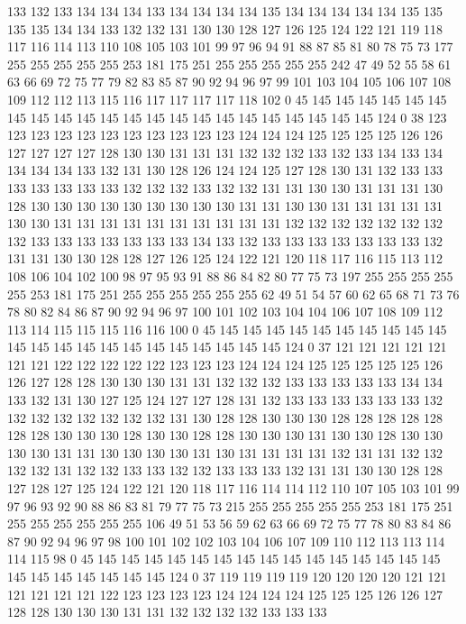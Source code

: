 133 132 133 134 134 134 133 134 134 134 134 135 134 134 134 134 134 135 135 135
135 134 134 133 132 132 131 130 130 128 127 126 125 124 122 121 119 118 117 116
114 113 110 108 105 103 101 99 97 96 94 91 88 87 85 81 80 78 75 73
177 255 255 255 255 255 253 181 175 251 255 255 255 255 255 242 47 49 52 55
58 61 63 66 69 72 75 77 79 82 83 85 87 90 92 94 96 97 99 101
103 104 105 106 107 108 109 112 112 113 115 116 117 117 117 117 118 102 0 45
145 145 145 145 145 145 145 145 145 145 145 145 145 145 145 145 145 145 145 145
145 145 124 0 38 123 123 123 123 123 123 123 123 123 123 123 124 124 124 125
125 125 125 126 126 127 127 127 127 128 130 130 131 131 131 132 132 132 133 132
133 134 133 134 134 134 134 133 132 131 130 128 126 124 124 125 127 128 130 131
132 133 133 133 133 133 133 133 132 132 132 133 132 132 131 131 130 130 131 131
131 130 128 130 130 130 130 130 130 130 130 130 131 131 130 130 131 131 131 131
131 130 130 131 131 131 131 131 131 131 131 131 131 132 132 132 132 132 132 132
132 133 133 133 133 133 133 133 134 133 132 133 133 133 133 133 133 133 132 131
131 130 130 128 128 127 126 125 124 122 121 120 118 117 116 115 113 112 108 106
104 102 100 98 97 95 93 91 88 86 84 82 80 77 75 73 197 255 255 255
255 255 253 181 175 251 255 255 255 255 255 255 62 49 51 54 57 60 62 65
68 71 73 76 78 80 82 84 86 87 90 92 94 96 97 100 101 102 103 104
104 106 107 108 109 112 113 114 115 115 115 116 116 100 0 45 145 145 145 145
145 145 145 145 145 145 145 145 145 145 145 145 145 145 145 145 145 145 124 0
37 121 121 121 121 121 121 121 122 122 122 122 122 123 123 123 124 124 124 125
125 125 125 125 126 126 127 128 128 130 130 130 131 131 132 132 132 133 133 133
133 133 134 134 133 132 131 130 127 125 124 127 127 128 131 132 133 133 133 133
133 133 132 132 132 132 132 132 132 132 131 130 128 128 130 130 130 128 128 128
128 128 128 128 130 130 130 128 130 130 128 128 130 130 130 131 130 130 128 130
130 130 130 131 131 130 130 130 130 131 130 131 131 131 131 132 131 131 132 132
132 132 131 132 132 133 133 132 132 133 133 133 132 131 131 130 130 128 128 127
128 127 125 124 122 121 120 118 117 116 114 114 112 110 107 105 103 101 99 97
96 93 92 90 88 86 83 81 79 77 75 73 215 255 255 255 255 255 253 181
175 251 255 255 255 255 255 255 106 49 51 53 56 59 62 63 66 69 72 75
77 78 80 83 84 86 87 90 92 94 96 97 98 100 101 102 102 103 104 106
107 109 110 112 113 113 114 114 115 98 0 45 145 145 145 145 145 145 145 145
145 145 145 145 145 145 145 145 145 145 145 145 145 145 124 0 37 119 119 119
119 120 120 120 120 121 121 121 121 121 121 122 123 123 123 123 124 124 124 124
125 125 125 126 126 127 128 128 130 130 130 131 131 132 132 132 132 133 133 133

